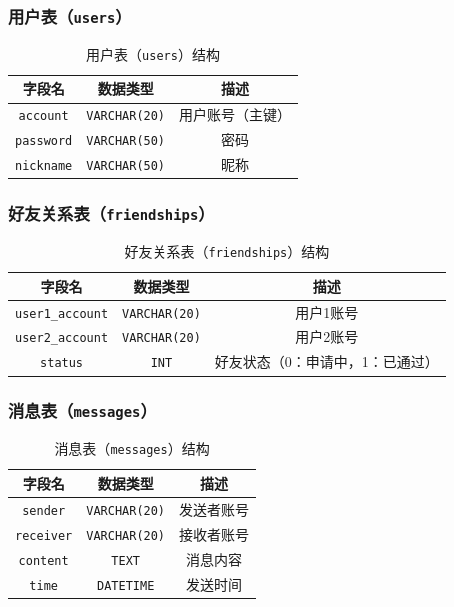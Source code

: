 \documentclass[UTF8]{ctexart}
\begin{document}
\subsubsection{用户表（\texttt{users}）}
\begin{table}[h]
	\centering
	\begin{tabular}{|c|c|c|}
		\hline
		字段名 & 数据类型 & 描述 \\
		\hline
		\texttt{account} & \texttt{VARCHAR(20)} & 用户账号（主键） \\
		\texttt{password} & \texttt{VARCHAR(50)} & 密码 \\
		\texttt{nickname} & \texttt{VARCHAR(50)} & 昵称 \\
		\hline
	\end{tabular}
	\caption{用户表（\texttt{users}）结构}
	\label{tab:users}
\end{table}

\subsubsection{好友关系表（\texttt{friendships}）}
\begin{table}[h]
	\centering
	\begin{tabular}{|c|c|c|}
		\hline
		字段名 & 数据类型 & 描述 \\
		\hline
		\texttt{user1\_account} & \texttt{VARCHAR(20)} & 用户1账号 \\
		\texttt{user2\_account} & \texttt{VARCHAR(20)} & 用户2账号 \\
		\texttt{status} & \texttt{INT} & 好友状态（0：申请中，1：已通过） \\
		\hline
	\end{tabular}
	\caption{好友关系表（\texttt{friendships}）结构}
	\label{tab:friendships}
\end{table}

\subsubsection{消息表（\texttt{messages}）}
\begin{table}[h]
	\centering
	\begin{tabular}{|c|c|c|}
		\hline
		字段名 & 数据类型 & 描述 \\
		\hline
		\texttt{sender} & \texttt{VARCHAR(20)} & 发送者账号 \\
		\texttt{receiver} & \texttt{VARCHAR(20)} & 接收者账号 \\
		\texttt{content} & \texttt{TEXT} & 消息内容 \\
		\texttt{time} & \texttt{DATETIME} & 发送时间 \\
		\hline
	\end{tabular}
	\caption{消息表（\texttt{messages}）结构}
	\label{tab:messages}
\end{table}
\end{document}
